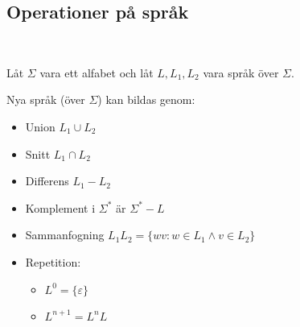 \subsection{Operationer på språk}\hfill\\
\par
\noindent Låt $\Sigma$ vara ett alfabet och låt $L, L_1, L_2$ vara språk över $\Sigma$.\par
\noindent Nya språk (över $\Sigma$) kan bildas genom:
\begin{itemize}
  \item Union $L_1\cup L_2$
  \item Snitt $L_1\cap L_2$
  \item Differens $L_1-L_2$
  \item Komplement i $\Sigma^*$ är $\Sigma^*-L$
  \item Sammanfogning $L_1L_2 = \{wv:w\in L_1\wedge v\in L_2\}$
  \item Repetition:
    \begin{itemize}
      \item $L^0 = \{\varepsilon\}$
      \item $L^{n+1} = L^nL$
    \end{itemize}
\end{itemize}
\par\bigskip
